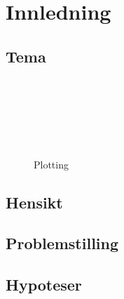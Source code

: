 \section{Innledning}

\subsection{Tema}

\lipsum[1-4]

\parencite{datatilsynet_personvern}\\
\parencite{regjeringen_personvern}\\
\parencite{regjeringen_gdpr}\\
\parencite{regjeringen_nylov}\\
\parencite{test}\\

\begin{figure}
    \centering
{}
\caption{Plotting}
\end{figure}

\subsection{Hensikt}

\subsection{Problemstilling}

\subsection{Hypoteser}

\newpage
